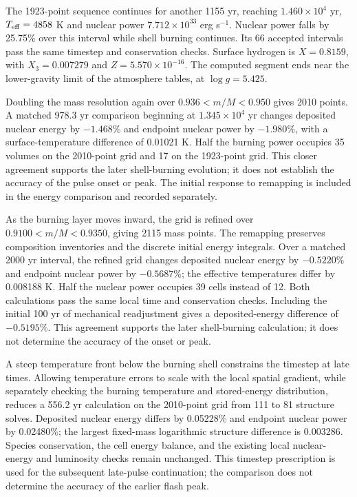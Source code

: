 \documentclass[11pt,letterpaper]{article}
\begin{document}
The 1923-point sequence continues for another 1155 yr, reaching
$1.460\times10^4$ yr, $T_{\rm eff}=4858$ K and nuclear power
$7.712\times10^{33}$ erg s$^{-1}$. Nuclear power falls by 25.75\%
over this interval while shell burning continues. Its 66 accepted intervals
pass the same timestep and conservation checks. Surface hydrogen is
$X=0.8159$, with $X_3=0.007279$ and $Z=5.570\times10^{-16}$.
The computed segment ends near the lower-gravity limit of the atmosphere
tables, at $\log g=5.425$.

Doubling the mass resolution again over $0.936<m/M<0.950$ gives
2010 points. A matched 978.3 yr comparison beginning at
$1.345\times10^4$ yr changes deposited nuclear energy by $-1.468\%$
and endpoint nuclear power by $-1.980\%$, with a surface-temperature
difference of 0.01021 K. Half the burning power occupies 35 volumes
on the 2010-point grid and 17 on the 1923-point grid. This closer agreement
supports the later shell-burning evolution; it does not establish the
accuracy of the pulse onset or peak. The initial response to remapping
is included in the energy comparison and recorded separately.

As the burning layer moves inward, the grid is refined over
$0.9100<m/M<0.9350$, giving 2115 mass points. The remapping preserves
composition inventories and the discrete initial energy integrals.
Over a matched 2000 yr interval, the refined grid changes deposited nuclear
energy by $-0.5220\%$ and endpoint nuclear power by $-0.5687\%$;
the effective temperatures differ by 0.008188 K. Half the nuclear power
occupies 39 cells instead of 12. Both calculations pass the same local
time and conservation checks. Including the initial 100 yr of mechanical
readjustment gives a deposited-energy difference of $-0.5195\%$.
This agreement supports the later shell-burning calculation; it does not
determine the accuracy of the onset or peak.

A steep temperature front below the burning shell constrains the timestep
at late times. Allowing temperature errors to scale with the local spatial
gradient, while separately checking the burning temperature and stored-energy
distribution, reduces a 556.2 yr calculation on the 2010-point grid from
111 to 81 structure solves. Deposited nuclear energy differs by 0.05228\%
and endpoint nuclear power by 0.02480\%; the largest fixed-mass logarithmic
structure difference is 0.003286. Species conservation, the cell energy
balance, and the existing local nuclear-energy and luminosity checks remain
unchanged. This timestep prescription is used for the subsequent late-pulse
continuation; the comparison does not determine the accuracy of the earlier
flash peak.
\end{document}
